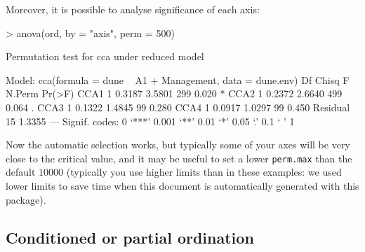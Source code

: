 \documentclass[a4paper,10pt]{amsart}
\begin{document}
Moreover, it is possible to analyse significance of each axis:
\begin{Schunk}
\begin{Sinput}
> anova(ord, by = "axis", perm = 500)
\end{Sinput}
\begin{Soutput}
Permutation test for cca under reduced model

Model: cca(formula = dune ~ A1 + Management, data = dune.env)
         Df  Chisq      F N.Perm Pr(>F)  
CCA1      1 0.3187 3.5801    299  0.020 *
CCA2      1 0.2372 2.6640    499  0.064 .
CCA3      1 0.1322 1.4845     99  0.280  
CCA4      1 0.0917 1.0297     99  0.450  
Residual 15 1.3355                       
---
Signif. codes:  0 ‘***’ 0.001 ‘**’ 0.01 ‘*’ 0.05 ‘.’ 0.1 ‘ ’ 1 
\end{Soutput}
\end{Schunk}
Now the automatic selection works, but typically some of your axes
will be very close to the critical value, and it may be useful to set
a lower \texttt{perm.max} than the default $10000$ (typically you use
higher limits than in these examples: we used lower limits to save
time when this document is automatically generated with this package).

\subsection{Conditioned or partial ordination}
\end{document}
